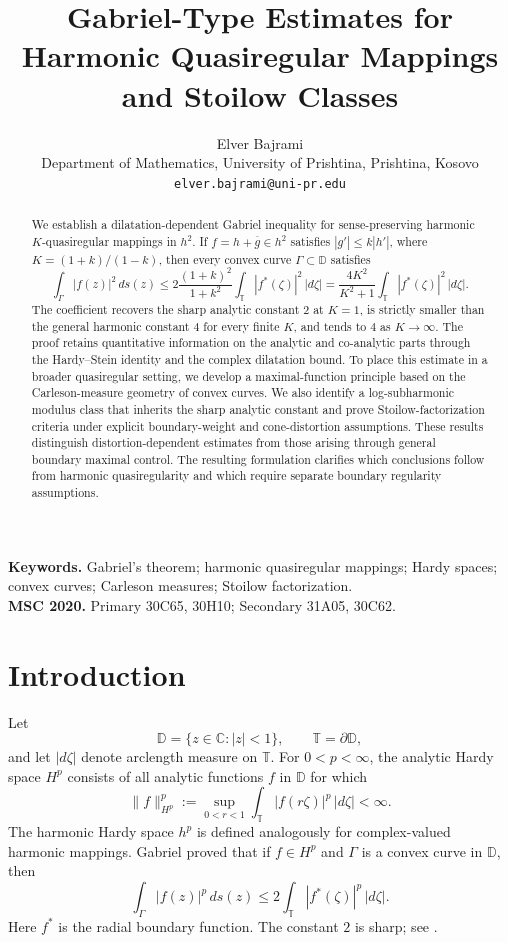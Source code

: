 \documentclass[11pt]{article}
\title{Gabriel-Type Estimates for Harmonic Quasiregular Mappings and Stoilow Classes}
\author{
  Elver Bajrami\\
  \small Department of Mathematics, University of Prishtina, Prishtina, Kosovo\\
  \small \texttt{elver.bajrami@uni-pr.edu}
}
\date{}
\theoremstyle{definition}
\theoremstyle{remark}
\newcommand{\D}{\mathbb D}
\newcommand{\T}{\mathbb T}
\newcommand{\C}{\mathbb C}
\newcommand{\ds}{\,ds}
\begin{document}
\maketitle

\begin{abstract}
We establish a dilatation-dependent Gabriel inequality for sense-preserving harmonic $K$-quasiregular mappings in $h^2$. If $f=h+\overline g\in h^2$ satisfies $|g'|\le k|h'|$, where $K=(1+k)/(1-k)$, then every convex curve $\Gamma\subset\D$ satisfies
\[
   \int_\Gamma |f(z)|^2\ds(z)
   \le 2\frac{(1+k)^2}{1+k^2}
      \int_\T |f^*(\zeta)|^2\,|d\zeta|
   =\frac{4K^2}{K^2+1}
      \int_\T |f^*(\zeta)|^2\,|d\zeta|.
\]
The coefficient recovers the sharp analytic constant $2$ at $K=1$, is strictly smaller than the general harmonic constant $4$ for every finite $K$, and tends to $4$ as $K\to\infty$. The proof retains quantitative information on the analytic and co-analytic parts through the Hardy--Stein identity and the complex dilatation bound. To place this estimate in a broader quasiregular setting, we develop a maximal-function principle based on the Carleson-measure geometry of convex curves. We also identify a log-subharmonic modulus class that inherits the sharp analytic constant and prove Stoilow-factorization criteria under explicit boundary-weight and cone-distortion assumptions. These results distinguish distortion-dependent estimates from those arising through general boundary maximal control. The resulting formulation clarifies which conclusions follow from harmonic quasiregularity and which require separate boundary regularity assumptions.
\end{abstract}

\noindent\textbf{Keywords.} Gabriel's theorem; harmonic quasiregular mappings; Hardy spaces; convex curves; Carleson measures; Stoilow factorization.\\
\textbf{MSC 2020.} Primary 30C65, 30H10; Secondary 31A05, 30C62.

\section{Introduction}

Let
\[
   \D=\{z\in\C: |z|<1\}, \qquad \T=\partial\D,
\]
and let $|d\zeta|$ denote arclength measure on $\T$. For $0<p<\infty$, the analytic Hardy space $H^p$ consists of all analytic functions $f$ in $\D$ for which
\[
   \|f\|_{H^p}^p
   :=\sup_{0<r<1}\int_\T |f(r\zeta)|^p\,|d\zeta|<\infty.
\]
The harmonic Hardy space $h^p$ is defined analogously for complex-valued harmonic mappings. Gabriel proved that if $f\in H^p$ and $\Gamma$ is a convex curve in $\D$, then
\begin{equation}\label{eq:Gabriel}
   \int_\Gamma |f(z)|^p\ds(z)
   \le 2\int_\T |f^*(\zeta)|^p\,|d\zeta|.
\end{equation}
Here $f^*$ is the radial boundary function. The constant $2$ is sharp; see \cite{Gabriel1928,Duren1970}.
\end{document}
